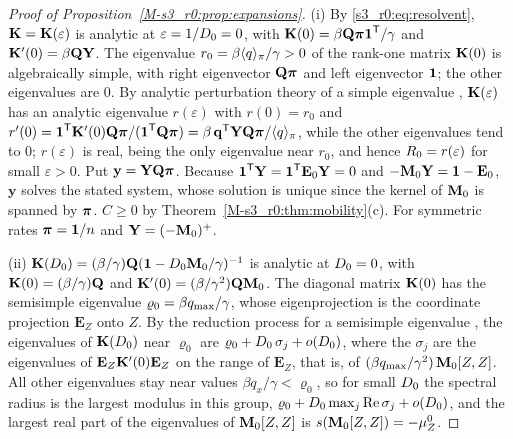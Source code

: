 \begin{proof}[Proof of Proposition~\ref{M-s3_r0:prop:expansions}]
  (i) By \eqref{s3_r0:eq:resolvent}, $\mathbf{K}=\mathbf{K}(\varepsilon)$ is analytic at $\varepsilon=1/D_0=0$, with
  $\mathbf{K}(0)=\beta\mathbf{Q}\boldsymbol{\pi}\boldsymbol{1}^{\mathsf{T}}/\gamma$ and $\mathbf{K}'(0)=\beta\mathbf{Q}\mathbf{Y}$.  The eigenvalue
  $r_0=\beta\langle q\rangle_{\pi}/\gamma>0$ of the rank-one matrix $\mathbf{K}(0)$ is algebraically simple, with right eigenvector
  $\mathbf{Q}\boldsymbol{\pi}$ and left eigenvector $\boldsymbol{1}$; the other eigenvalues are $0$.  By analytic perturbation theory of
  a simple eigenvalue \citep[Chapter~II, \S1]{kato1995perturbation}, $\mathbf{K}(\varepsilon)$ has an analytic
  eigenvalue $r(\varepsilon)$ with $r(0)=r_0$ and
  $r'(0)=\boldsymbol{1}^{\mathsf{T}}\mathbf{K}'(0)\mathbf{Q}\boldsymbol{\pi}/(\boldsymbol{1}^{\mathsf{T}}\mathbf{Q}\boldsymbol{\pi})=\beta\,\mathbf{q}^{\mathsf{T}}\mathbf{Y}\mathbf{Q}\boldsymbol{\pi}/\langle q\rangle_{\pi}$, while the
  other eigenvalues tend to $0$; $r(\varepsilon)$ is real, being the only eigenvalue near $r_0$, and hence
  $R_0=r(\varepsilon)$ for small $\varepsilon>0$.  Put $\mathbf{y}=\mathbf{Y}\mathbf{Q}\boldsymbol{\pi}$.  Because
  $\boldsymbol{1}^{\mathsf{T}}\mathbf{Y}=\boldsymbol{1}^{\mathsf{T}}\mathbf{E}_0\mathbf{Y}=0$ and $-\mathbf{M}_0\mathbf{Y}=\mathbf{1}-\mathbf{E}_0$, $\mathbf{y}$
  solves the stated system, whose solution is unique since the kernel of $\mathbf{M}_0$ is spanned by $\boldsymbol{\pi}$.  $C\ge0$ by Theorem~\ref{M-s3_r0:thm:mobility}(c).  For symmetric
  rates $\boldsymbol{\pi}=\boldsymbol{1}/n$ and $\mathbf{Y}=(-\mathbf{M}_0)^{+}$.

  (ii) $\mathbf{K}(D_0)=(\beta/\gamma)\mathbf{Q}(\mathbf{1}-D_0\mathbf{M}_0/\gamma)^{-1}$ is analytic at $D_0=0$, with
  $\mathbf{K}(0)=(\beta/\gamma)\mathbf{Q}$ and $\mathbf{K}'(0)=(\beta/\gamma^2)\mathbf{Q}\mathbf{M}_0$.  The diagonal matrix $\mathbf{K}(0)$ has the
  semisimple eigenvalue $\varrho_0=\beta q_{\max}/\gamma$, whose eigenprojection is the coordinate projection
  $\mathbf{E}_Z$ onto $Z$.  By the reduction process for a semisimple eigenvalue
  \citep[Chapter~II, \S2]{kato1995perturbation}, the eigenvalues of $\mathbf{K}(D_0)$ near $\varrho_0$ are
  $\varrho_0+D_0\,\sigma_j+o(D_0)$, where the $\sigma_j$ are the eigenvalues of
  $\mathbf{E}_Z\mathbf{K}'(0)\mathbf{E}_Z$ on the range of $\mathbf{E}_Z$, that is, of
  $(\beta q_{\max}/\gamma^2)\,\mathbf{M}_0[Z,Z]$.  All other eigenvalues stay near values $\beta q_x/\gamma<\varrho_0$, so
  for small $D_0$ the spectral radius is the largest modulus in this group,
  $\varrho_0+D_0\max_j\operatorname{Re}\sigma_j+o(D_0)$, and the largest real part of the eigenvalues of
  $\mathbf{M}_0[Z,Z]$ is $s(\mathbf{M}_0[Z,Z])=-\mu^0_Z$.
\end{proof}


